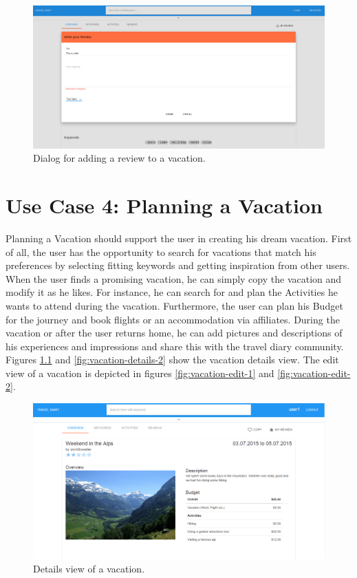 \documentclass[IN,english]{tumbook}
\begin{document}
\begin{figure}
	\includegraphics[width=\textwidth]{pictures/review-vacation}
	\caption{Dialog for adding a review to a vacation.}
	\label{fig:dialog-vacation-review}
\end{figure}

\chapter{Use Case 4: Planning a Vacation}
Planning a Vacation should support the user in creating his dream vacation. First of all, the user has the opportunity to search for vacations that match his preferences by selecting fitting keywords and getting inspiration from other users. When the user finds a promising vacation, he can simply copy the vacation and modify it as he likes. For instance, he can search for and plan the Activities he wants to attend during the vacation. Furthermore, the user can plan his Budget for the journey and book flights or an accommodation via affiliates.
During the vacation or after the user returns home, he can add pictures and descriptions of his experiences and impressions and share this with the travel diary community. Figures \ref{fig:vacation-details-1} and \ref{fig:vacation-details-2} show the vacation details view. The edit view of a vacation is depicted in figures \ref{fig:vacation-edit-1} and \ref{fig:vacation-edit-2}.


\begin{figure}
	\includegraphics[width=\textwidth]{pictures/UseCase4_1}
	\caption{Details view of a vacation.}
	\label{fig:vacation-details-1}
\end{figure}
\end{document}
